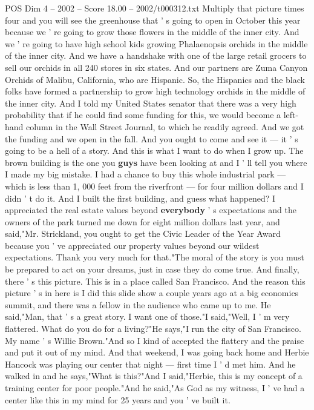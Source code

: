 \begin{textsample}{POS Dim 4 – 2002 – Score 18.00 – 2002/t000312.txt}
Multiply that picture times four and you will see the greenhouse that ' s going to open in October this year because we ' re going to grow those flowers in the middle of the inner city.
And we ' re going to have high school kids growing Phalaenopsis orchids in the middle of the inner city.
And we have a handshake with one of the large retail grocers to sell our orchids in all 240 stores in six states.
And our partners are Zuma Canyon Orchids of Malibu, California, who are Hispanic.
So, the Hispanics and the black folks have formed a partnership to grow high technology orchids in the middle of the inner city.
And I told my United States senator that there was a very high probability that if he could find some funding for this, we would become a left-hand column in the Wall Street Journal, to which he readily agreed.
And we got the funding and we open in the fall.
And you ought to come and see it — it ' s going to be a hell of a story.
And this is what I want to do when I grow up.
The brown building is the one you \textbf{guys} have been looking at and I ' ll tell you where I made my big mistake.
I had a chance to buy this whole industrial park — which is less than 1, 000 feet from the riverfront — for four million dollars and I didn ' t do it.
And I built the first building, and guess what happened?
I appreciated the real estate values beyond \textbf{everybody} ' s expectations and the owners of the park turned me down for eight million dollars last year, and said,"Mr.
Strickland, you ought to get the Civic Leader of the Year Award because you ' ve appreciated our property values beyond our wildest expectations.
Thank you very much for that."The moral of the story is you must be prepared to act on your dreams, just in case they do come true.
And finally, there ' s this picture.
This is in a place called San Francisco.
And the reason this picture ' s in here is I did this slide show a couple years ago at a big economics summit, and there was a fellow in the audience who came up to me.
He said,"Man, that ' s a great story.
I want one of those."I said,"Well, I ' m very flattered.
What do you do for a living?"He says,"I run the city of San Francisco.
My name ' s Willie Brown."And so I kind of accepted the flattery and the praise and put it out of my mind.
And that weekend, I was going back home and Herbie Hancock was playing our center that night — first time I ' d met him.
And he walked in and he says,"What is this?"And I said,"Herbie, this is my concept of a training center for poor people."And he said,"As God as my witness, I ' ve had a center like this in my mind for 25 years and you ' ve built it.

\end{textsample}

